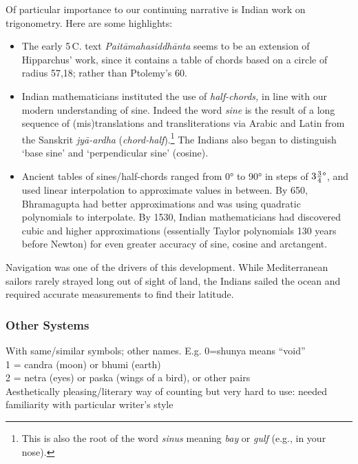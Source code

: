 Of particular importance to our continuing narrative is Indian work on trigonometry. Here are some highlights:
\begin{itemize}
  \item The early 5\th\,C.{} text \emph{Paitāmahasiddhānta} seems to be an extension of Hipparchus' work, since it contains a table of chords based on a circle of radius 57,18; rather than Ptolemy's 60.
  \item Indian mathematicians instituted the use of \emph{half-chords,} in line with our modern understanding of sine. Indeed the word \emph{sine} is the result of a long sequence of (mis)translations and transliterations via Arabic and Latin from the Sanskrit \emph{jyā-ardha} (\emph{chord-half}).\footnote{
  This is also the root of the word \emph{sinus} meaning \emph{bay} or \emph{gulf} (e.g., in your nose).
 } The Indians also began to distinguish `base sine' and `perpendicular sine' (cosine).
  \item Ancient tables of sines/half-chords ranged from \ang{0} to \ang{90} in steps of $\ang{3\frac 34}$, and used linear interpolation to approximate values in between. By 650, Bhramagupta had better approximations and was using quadratic polynomials to interpolate. By 1530, Indian mathematicians had discovered cubic and higher approximations (essentially Taylor polynomials 130 years before Newton) for even greater accuracy of sine, cosine and arctangent.
\end{itemize}

Navigation was one of the drivers of this development. While Mediterranean sailors rarely strayed long out of sight of land, the Indians sailed the ocean and required accurate measurements to find their latitude.

\iffalse
\subsubsection*{Other Systems}

With same/similar symbols; other names. E.g. 0=shunya means ``void''\\
1 = candra (moon) or bhumi (earth)\\
2 = netra (eyes) or paska (wings of a bird), or other pairs\\
Aesthetically pleasing/literary way of counting but very hard to use: needed familiarity with particular writer's style\\

